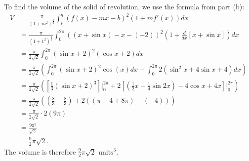 \documentclass[12pt]{article}
\begin{document}
\begin{enumerate}
\begin{enumerate}
                    To find the volume of the solid of revolution, we use the formula from part (b):
                    \begin{align*}
                        V & = \frac{\pi}{(1 + m^2)^\frac{3}{2}} \int_p^q (f(x) - m x - b)^2 (1 + m f'(x)) dx                                                                                                          \\
                          & = \frac{\pi}{(1 + 1^2)^\frac{3}{2}} \int_0^{2\pi} ((x + \sin x) - x - (-2))^2 \left( 1 + \frac{d}{dx}[x + \sin x] \right) dx                                                              \\
                          & = \frac{\pi}{2\sqrt{2}} \int_0^{2\pi} (\sin x + 2)^2 (\cos x + 2) dx                                                                                                                      \\
                          & = \frac{\pi}{2\sqrt{2}} \left( \int_0^{2\pi} (\sin x + 2)^2 \cos(x) dx + \int_0^{2\pi} 2(\sin^2 x + 4\sin x + 4) dx \right)                                                               \\
                          & = \frac{\pi}{2\sqrt{2}} \left( \left[ \tfrac{1}{3} (\sin x + 2)^3 \right] \big|_0^{2\pi} + 2 \left[ (\tfrac{1}{2} x - \tfrac{1}{4} \sin 2x) - 4\cos x + 4x \right] \big|_0^{2\pi} \right) \\
                          & = \frac{\pi}{2\sqrt{2}} \left( (\tfrac{8}{3} - \tfrac{8}{3}) + 2 ((\pi - 4 + 8\pi) - (-4)) \right)                                                                                        \\
                          & = \frac{\pi}{2\sqrt{2}} \cdot 2(9\pi)                                                                                                                                                     \\
                          & = \frac{9\pi^2}{\sqrt{2}}                                                                                                                                                                 \\
                          & = \tfrac{9}{2}\pi\sqrt{2}.
                    \end{align*}
                    The volume is therefore $\tfrac{9}{2}\pi\sqrt{2} \text{ units}^3$.
          \end{enumerate}
\end{enumerate}
\end{document}
